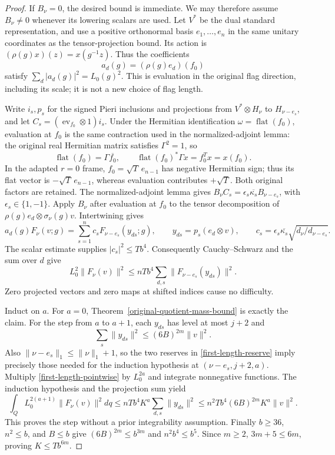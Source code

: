 \begin{proof}
If $B_\nu=0$, the desired bound is immediate.  We may therefore
assume $B_\nu\ne0$ whenever its lowering scalars are used.
Let $V^*$ be the dual standard representation, and use a positive
orthonormal basis $e_1,\ldots,e_n$ in the same unitary coordinates
as the tensor-projection bound.  Its action is
$(\rho(g)x)(z)=x(g^{-1}z)$.  Thus the coefficients
\[
         a_d(g)=(\rho(g)e_d)(f_0)
\]
satisfy $\sum_d|a_d(g)|^2=L_0(g)^2$.  This is evaluation in the
original flag direction, including its scale; it is not a new
choice of flag length.

Write $i_s,p_s$ for the signed Pieri inclusions and projections
from $V^*\otimes H_\nu$ to $H_{\nu-e_s}$, and let
$C_s=(\operatorname{ev}_{f_0}\otimes1)i_s$.  Under the Hermitian
identification $\omega=\operatorname{flat}(f_0)$, evaluation at
$f_0$ is the same contraction used in the normalized-adjoint lemma:
the original real Hermitian matrix satisfies $\Gamma^2=1$, so
\[
 \operatorname{flat}(f_0)=\Gamma\overline{f_0},\qquad
 \operatorname{flat}(f_0)^*\Gamma x=f_0^Tx=x(f_0).
\]
In the adapted $r=0$ frame, $f_0=\sqrt T\,e_{n-1}$ has negative
Hermitian sign; thus its flat vector is $-\sqrt T\,e_{n-1}$,
whereas evaluation contributes $+\sqrt T$.  Both original factors
are retained.
The normalized-adjoint lemma gives
$B_\nu C_s=\epsilon_s\overline{\kappa_s}B_{\nu-e_s}$, with
$\epsilon_s\in\{1,-1\}$.  Apply $B_\nu$ after evaluation at
$f_0$ to the tensor decomposition of
$\rho(g)e_d\otimes\sigma_\nu(g)v$.  Intertwining gives
\begin{equation}\label{first-length-tensor-transfer}
 a_d(g)F_\nu(v;g)
    =\sum_{s=1}^n c_s F_{\nu-e_s}(y_{ds};g),\qquad
 y_{ds}=p_s(e_d\otimes v),\qquad
 c_s=\epsilon_s\overline{\kappa_s}
                         \sqrt{d_\nu/d_{\nu-e_s}}.
\end{equation}
The scalar estimate supplies $|c_s|^2\le T b^4$.
Consequently Cauchy--Schwarz and the sum over $d$ give
\begin{equation}\label{first-length-pointwise}
 L_0^2\|F_\nu(v)\|^2
       \le nT b^4\sum_{d,s}\|F_{\nu-e_s}(y_{ds})\|^2.
\end{equation}
Zero projected vectors and zero maps at shifted indices cause no
difficulty.

Induct on $a$.  For $a=0$,
Theorem~\ref{original-quotient-mass-bound} is exactly the claim.
For the step from $a$ to $a+1$, each $y_{ds}$ has level at most
$j+2$ and
\[
       \sum_s\|y_{ds}\|^2\le(6B)^{2m}\|v\|^2.
\]
Also $\|\nu-e_s\|_1\le\|\nu\|_1+1$, so the two reserves
in \eqref{first-length-reserve} imply precisely those needed for
the induction hypothesis at $(\nu-e_s,j+2,a)$.
Multiply \eqref{first-length-pointwise} by $L_0^{2a}$ and
integrate nonnegative functions.  The induction hypothesis and the
projection sum yield
\[
 \int_Q L_0^{2(a+1)}\|F_\nu(v)\|^2dq
 \le nT b^4K^a\sum_{d,s}\|y_{ds}\|^2
 \le n^2T b^4(6B)^{2m}K^a\|v\|^2.
\]
This proves the step without a prior integrability assumption.
Finally $b\ge36$, $n^2\le b$, and $B\le b$ give
$(6B)^{2m}\le b^{3m}$ and
$n^2b^4\le b^5$.  Since $m\ge2$, $3m+5\le6m$, proving
$K\le T b^{6m}$.
\end{proof}

